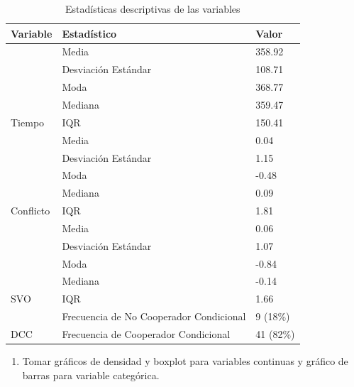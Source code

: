 \documentclass[
  spanish,
  10pt,
]{article}
\providecommand{\tightlist}{%
  \setlength{\itemsep}{0pt}\setlength{\parskip}{0pt}}
\begin{document}
\begin{table}[H]
\centering
\caption{\label{tab:unnamed-chunk-3}Estadísticas descriptivas de las variables}
\centering
\begin{tabular}[t]{lll}
\toprule
Variable & Estadístico & Valor\\
\midrule
 & Media & 358.92\\
\cmidrule{2-3}
 & Desviación Estándar & 108.71\\
\cmidrule{2-3}
 & Moda & 368.77\\
\cmidrule{2-3}
 & Mediana & 359.47\\
\cmidrule{2-3}
\multirow[t]{-5}{*}{\raggedright\arraybackslash Tiempo} & IQR & 150.41\\
\cmidrule{1-3}
 & Media & 0.04\\
\cmidrule{2-3}
 & Desviación Estándar & 1.15\\
\cmidrule{2-3}
 & Moda & -0.48\\
\cmidrule{2-3}
 & Mediana & 0.09\\
\cmidrule{2-3}
\multirow[t]{-5}{*}{\raggedright\arraybackslash Conflicto} & IQR & 1.81\\
\cmidrule{1-3}
 & Media & 0.06\\
\cmidrule{2-3}
 & Desviación Estándar & 1.07\\
\cmidrule{2-3}
 & Moda & -0.84\\
\cmidrule{2-3}
 & Mediana & -0.14\\
\cmidrule{2-3}
\multirow[t]{-5}{*}{\raggedright\arraybackslash SVO} & IQR & 1.66\\
\cmidrule{1-3}
 & Frecuencia de No Cooperador Condicional & 9 (18\%)\\
\cmidrule{2-3}
\multirow[t]{-2}{*}{\raggedright\arraybackslash DCC} & Frecuencia de Cooperador Condicional & 41 (82\%)\\
\bottomrule
\end{tabular}
\end{table}

\newpage

\begin{enumerate}
\def\labelenumi{(\alph{enumi})}
\setcounter{enumi}{1}
\tightlist
\item
  Tomar gráficos de densidad y boxplot para variables continuas y
  gráfico de barras para variable categórica.
\end{enumerate}
\end{document}
